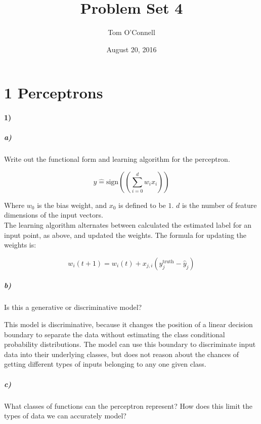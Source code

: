 \documentclass[10pt,letter]{article}
\begin{document}


\title{Problem Set 4}

\author{Tom O'Connell}

\date{August 20, 2016}
 
\maketitle 


\section*{1 Perceptrons}

\paragraph{1)}

\subparagraph{a)} Write out the functional form and learning algorithm for the perceptron.

\[ y\hat = \text{sign}((\sum_{i=0}^{d}{w_ix_i}))  \]

Where $w_0$ is the bias weight, and $x_0$ is defined to be $1$. $d$ is the number of feature 
dimensions of the input vectors.\\

The learning algorithm alternates between calculated the estimated label for an input point, as 
above, and updated the weights.  The formula for updating the weights is:

\[ w_i(t + 1) = w_i(t) + x_{j,i} (y_j^\text{truth} - \hat{y}_j)  \]

\subparagraph{b)} Is this a generative or discriminative model?

This model is discriminative, because it changes the position of a linear decision boundary to 
separate the data without estimating the class conditional probability distributions. The model 
can use this boundary to discriminate input data into their underlying classes, but does not reason
 about the chances of getting different types of inputs belonging to any one given class.

\subparagraph{c)} What classes of functions can the perceptron represent? How does this limit the types of data we can accurately model? \\
\end{document}
